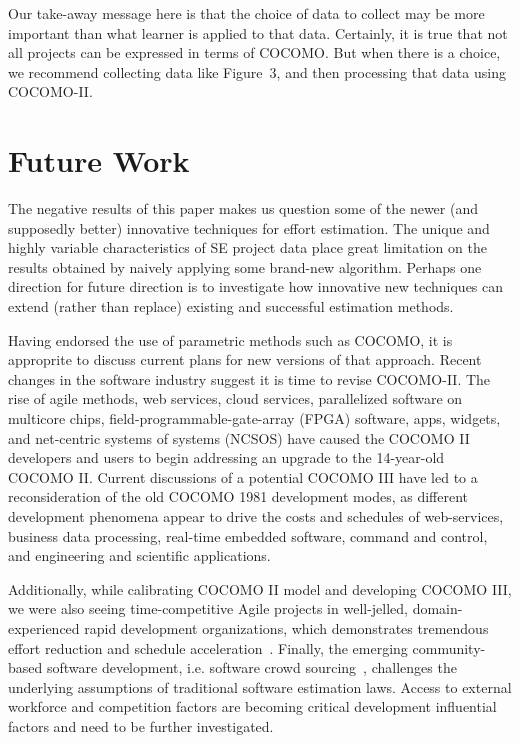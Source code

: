 \documentclass[smallcondesed]{svjour3}
\begin{document}
Our take-away message here is that the choice of data to collect may be more
important than what learner is applied to that data. Certainly, it is true that
not all projects can be expressed in terms of COCOMO. But when there is a choice,
we recommend collecting data like Figure~3, and then processing that data using COCOMO-II.

 

\section{Future Work}

The negative results of this paper makes us question 
some of the newer (and supposedly better) innovative techniques for effort estimation.  
The unique and highly variable characteristics of SE
project data place great limitation on the results
obtained by naively applying some brand-new
algorithm.  Perhaps one direction for future direction is to
investigate how innovative new techniques can extend
(rather than replace) existing and successful
estimation methods.  
 

Having endorsed the use of parametric methods such as COCOMO, it is approprite
to discuss current plans for new versions of that approach.
Recent changes  in the software industry
suggest  it is time  to revise COCOMO-II.
The rise of agile methods, web
services, cloud services, parallelized software on
multicore chips, field-programmable-gate-array
(FPGA) software, apps, widgets, and net-centric
systems of systems (NCSOS) have caused the COCOMO II
developers and users to begin addressing an upgrade
to the 14-year-old COCOMO II. 
Current discussions
of a potential COCOMO III have led to a
reconsideration of the old COCOMO 1981 development
modes, as different development phenomena appear to
drive the costs and schedules of web-services,
business data processing, real-time embedded
software, command and control, and engineering and
scientific applications. 

Additionally, while calibrating COCOMO II model and developing COCOMO III, we were also seeing time-competitive Agile projects in well-jelled, domain-experienced rapid development organizations, which demonstrates tremendous effort reduction and schedule acceleration~\cite{ingold13}. Finally, the emerging community-based software development, i.e. software crowd sourcing~\cite{yang13}, challenges the underlying assumptions of traditional software estimation laws. Access to external workforce and competition factors are becoming critical development influential factors and need to be further investigated.   
\end{document}
